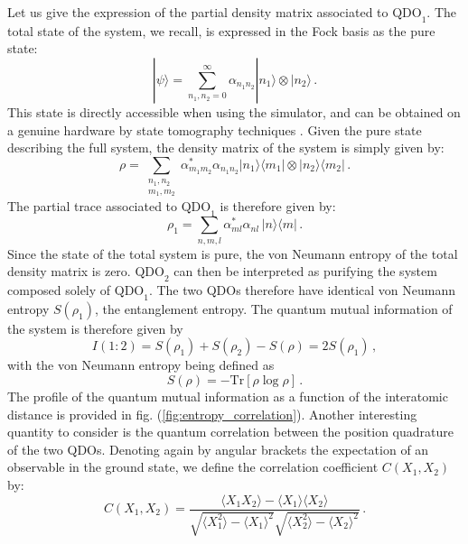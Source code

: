 \documentclass[reprint, amsmath, amssymb, aps, pra]{revtex4-2}
\begin{document}
    Let us give the expression of the partial density matrix associated to $\text{QDO}_1$. The total state of the system, we recall, is expressed in the Fock basis as the pure state:
    \begin{equation}
        |\psi\rangle = \sum_{n_1,n_{2}=0}^\infty \alpha_{n_1n_2}|n_1\rangle\otimes|n_2\rangle\,.
    \end{equation}
    This state is directly accessible when using the simulator, and can be obtained on a genuine hardware by state tomography techniques \cite{Lvovsky:2009zz}. Given the pure state describing the full system, the density matrix of the system is simply given by:
    \begin{equation*}
        \rho = \sum_{\substack{n_1,n_2 \\ m_1,m_2}} \alpha^*_{m_1m_2}\alpha_{n_1n_2}|n_1\rangle\langle m_1|\otimes|n_2\rangle\langle m_2|\,.
    \end{equation*}
    The partial trace associated to $\text{QDO}_1$ is therefore given by:
    \begin{equation}
        \rho_1 = \sum_{n, m, l} \alpha^*_{ml}\alpha_{nl}\,|n\rangle\langle m|\,.
    \end{equation}
    Since the state of the total system is pure, the von Neumann entropy of the total density matrix is zero. $\text{QDO}_2$ can then be interpreted as purifying the system composed solely of $\text{QDO}_1$. The two QDOs therefore have identical von Neumann entropy $S(\rho_1)$, the entanglement entropy. The quantum mutual information of the system is therefore given by
    \begin{equation}
        I(1:2) = S(\rho_1) + S(\rho_2) - S(\rho) = 2S(\rho_1) \,,
    \end{equation}
    with the von Neumann entropy being defined as
    \begin{equation}
        S(\rho) = -\text{Tr}\left[\rho\log\rho\right]\,.
    \end{equation}
    The profile of the quantum mutual information as a function of the interatomic distance is provided in fig. (\ref{fig:entropy_correlation}).
    Another interesting quantity to consider is the quantum correlation between the position quadrature of the two QDOs. Denoting again by angular brackets the expectation of an observable in the ground state, we define the correlation coefficient $C(X_1, X_2)$ by:
    \begin{equation}
        C(X_1, X_2) = \frac{\langle X_1X_2\rangle - \langle X_1\rangle\langle X_2\rangle}{\sqrt{\langle X_1^2\rangle - \langle X_1\rangle^2}\sqrt{\langle X_2^2\rangle - \langle X_2\rangle^2}}\,.
    \end{equation}
\end{document}
